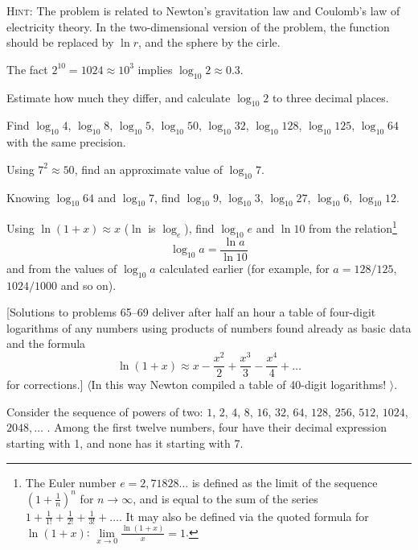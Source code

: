 \documentclass[12pt]{article}  %
\begin{document}
\medskip
\textsc{Hint:} The problem is related to Newton's gravitation law and Coulomb's law of electricity theory.
In the two-dimensional version of the problem, the function should be replaced by $\ln r$, and the sphere by the cirle.


\bigskip
{} The fact $2^{10}=1024 \approx 10^3$ implies
$\log_{10} 2 \approx 0{.}3$.

Estimate how much they differ, and calculate $\log_{10} 2$ to three decimal places. 

\bigskip
{} Find $\log_{10} 4$, $\log_{10} 8$,
$\log_{10} 5$, $\log_{10} 50$, $\log_{10} 32$, $\log_{10} 128$,
$\log_{10} 125$, $\log_{10} 64$ with the same precision.

\bigskip
{} Using $7^2 \approx 50$, find an approximate value of $\log_{10} 7$.

\bigskip
{} Knowing $\log_{10} 64$ and $\log_{10} 7$, find $\log_{10} 9$, $\log_{10} 3$,
    $\log_{10} 27$, $\log_{10} 6$, $\log_{10} 12$.

\bigskip
{} Using $\ln (1+x) \approx x$ ($\ln$ is $\log_e$), find $\log_{10} e$ and
    $\ln 10$ from the relation\footnote{
The Euler number $e = 2{,}71828\dots$ is defined as the limit of the sequence
  $\left(1+\frac1n\right)^n$ for $n\to \infty$, and is equal to the sum of the series 
$1+\frac 1{1!} +\frac 1{2!}+\frac 1{3!}+\dots$. It may also be defined via the quoted formula for 
 $\ln (1+x)$: $\lim\limits_{x\to 0}\frac{\ln(1+x)}{x} = 1$. }\vspace{-\jot}
%
$$
\log_{10} a=\frac{\ln a}{\ln 10}
$$ 
and from the values of $\log_{10} a$ calculated earlier (for example, for $a=128/125$, $1024/1000$
and so on).

[Solutions to problems 65--69 deliver after half an hour a table of four-digit logarithms of any numbers using
products of numbers found already as basic data and the formula  
\vspace{-2\jot}
\[
\ln (1+x) \approx x-\frac{x^2}{2}+\frac{x^3}{3}-\frac{x^4}{4}+\dots
\]
for corrections.] $\langle$In this way Newton compiled a table of
40-digit logarithms!%
$\rangle$.

\bigskip
{} Consider the sequence of powers of two: $1$, $2$, $4$, $8$, $16$, $32$, $64$,
$128$, $256$, $512$, $1024$, $2048, \dots$ . Among the first twelve numbers, four have their decimal expression
starting with 1, and none has it starting with 7.
\end{document}
